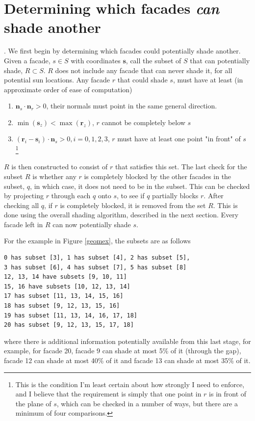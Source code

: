 \documentclass[11pt]{article}
\begin{document}
\section{Determining which facades \emph{can} shade another}.
We first begin by determining which facades could potentially shade another. Given a facade, $s \in S$ with coordinates $\mathbf{s}$, call the subset of $S$ that can potentially shade, $R \subset S$. $R$ does not include any facade that can never shade it, for all potential sun locations.  Any facade $r$ that could shade $s$, must have at least (in approximate order of ease of computation)
\begin{enumerate}
\item $\mathbf{n}_{s}\cdot \mathbf{n}_{r} > 0$, their normals must point in the same general direction.
\item $\min(\mathbf{s}_{z}) < \max(\mathbf{r}_{z})$, $r$ cannot be completely below $s$
\item $(\mathbf{r}_i-\mathbf{s}_i) \cdot \mathbf{n}_s > 0, i = 0,1,2,3$, $r$ must have at least one point "in front" of $s$ \footnote{This is the condition I'm least certain about how strongly I need to enforce, and I believe that the requirement is simply that one point in $r$ is in front of the plane of $s$, which can be checked in a number of ways, but there are a minimum of four comparisons.}
\end{enumerate}
$R$ is then constructed to consist of $r$ that satisfies this set. The last check for the subset $R$ is whether any $r$ is completely blocked by the other facades in the subset, $q$, in which case, it does not need to be in the subset. This can be checked by projecting $r$ through each $q$ onto $s$, to see if $q$ partially blocks $r$. After checking all $q$, if $r$ is completely blocked, it is removed from the set $R$. This is done using the overall shading algorithm, described in the next section. Every facade left in $R$ can now potentially shade $s$.

For the example in Figure \ref{geomex}, the subsets are as follows
\begin{verbatim}
0 has subset [3], 1 has subset [4], 2 has subset [5], 
3 has subset [6], 4 has subset [7], 5 has subset [8]
12, 13, 14 have subsets [9, 10, 11]
15, 16 have subsets [10, 12, 13, 14]
17 has subset [11, 13, 14, 15, 16]
18 has subset [9, 12, 13, 15, 16]
19 has subset [11, 13, 14, 16, 17, 18]
20 has subset [9, 12, 13, 15, 17, 18]
\end{verbatim}
where there is additional information potentially available from this last stage, for example, for facade 20, facade 9 can shade at most 5\% of it (through the gap), facade 12 can shade at most 40\% of it and facade 13 can shade at most 35\% of it.
\end{document}
